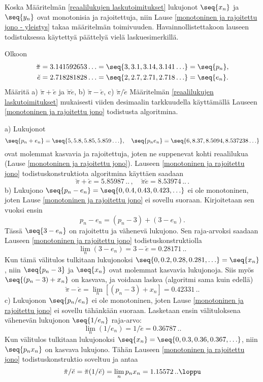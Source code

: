 Koska Määritelmän \ref{reaalilukujen laskutoimitukset} lukujonot $\seq{x_n}$ ja $\seq{y_n}$ ovat
monotonisia ja rajoitettuja, niin Lause \ref{monotoninen ja rajoitettu jono - yleistys} takaa
määritelmän toimivuuden. Havainnollistettakoon lauseen todistuksessa käytettyä päättelyä vielä
laskuesimerkillä.
\begin{Exa} \label{laskuesimerkki desimaaliluvuilla pi ja e} Olkoon
\begin{align*}
\breve{\pi} &= 3.141592653\ldots = \seq{3,3.1,3.14,3.141\ldots} = \seq{p_n}, \\
\breve{e}   &= 2.718281828\ldots = \seq{2,2.7,2.71,2.718\ldots} = \seq{e_n}.
\end{align*}
Määritä a) $\breve{\pi}+\breve{e}$ ja $\breve{\pi}\breve{e}$, b) $\breve{\pi}-\breve{e}$,
c) $\breve{\pi}/\breve{e}$ Määritelmän \ref{reaalilukujen laskutoimitukset} mukaisesti
viiden desimaalin tarkkuudella käyttämällä Lauseen \ref{monotoninen ja rajoitettu jono}
todistusta algoritmina.
\end{Exa}
\ratk a) Lukujonot
\[
\seq{p_n+e_n}=\seq{5,5.8,5.85,5.859\ldots}, \quad 
\seq{p_ne_n}=\seq{6,8.37,8.5094,8.537238\ldots}
\]
ovat molemmat kasvavia ja rajoitettuja, joten ne suppenevat kohti reaalilukua
(Lause \ref{monotoninen ja rajoitettu jono}). Lauseen \ref{monotoninen ja rajoitettu jono} 
todistuskonstruktiota algoritmina käyttäen saadaan
\[
\breve{\pi}+\breve{e} = 5.85987\,..\,, \quad \breve{\pi}\breve{e}  = 8.53974\,..\,.
\]
b) Lukujono $\seq{p_n-e_n}=\seq{0,0.4,0.43,0.423,\ldots}$ ei ole monotoninen, joten Lause
\ref{monotoninen ja rajoitettu jono} ei sovellu suoraan. Kirjoitetaan sen vuoksi ensin
\[
p_n-e_n = (p_n-3) + (3-e_n).
\]
Tässä $\seq{3-e_n}$ on rajoitettu ja vähenevä lukujono. Sen raja-arvoksi saadaan Lauseen
\ref{monotoninen ja rajoitettu jono} todistuskonstruktiolla
\[
\lim_n(3-e_n) = 3-\breve{e} = 0.28171\,..
\]
Kun tämä välitulos tulkitaan lukujonoksi $\seq{0,0.2,0.28,0.281,\ldots}=\seq{x_n}$, niin
$\seq{p_n-3}$ ja $\seq{x_n}$ ovat molemmat kasvavia lukujonoja. Siis myös $\seq{(p_n-3)+x_n}$
on kasvava, ja voidaan laskea (algoritmi sama kuin edellä)
\[
\breve{\pi}-\breve{e} = \lim_n[(p_n-3)+x_n] = 0.42331\,.. 
\]
c) Lukujonon $\seq{p_n/e_n}$ ei ole monotoninen, joten Lause
\ref{monotoninen ja rajoitettu jono} ei sovellu tähänkään suoraan. Lasketaan ensin
välituloksena vähenevän lukujonon $\seq{1/e_n}$ raja-arvo:
\[
\lim_n(1/e_n) = 1/\breve{e} = 0.36787\,..
\]
Kun välitulos tulkitaan lukujonoksi $\seq{x_n}=\seq{0,0.3,0.36,0.367,\ldots}$, niin
$\seq{p_nx_n}$ on kasvava lukujono. Tähän Lauseen \ref{monotoninen ja rajoitettu jono}
todistuskonstruktio soveltuu ja antaa
\[
\breve{\pi}/\breve{e} = \breve{\pi}(1/\breve{e}) = \lim_n p_nx_n = 1.15572\,.. \loppu
\]

